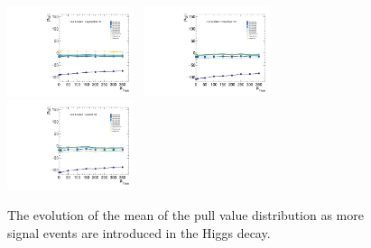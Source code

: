 \begin{figure}[!ht]
  \includegraphics[width=0.33\textwidth]{Fig/BiasStudy/Linearity/HJpsiG/pull_mean_linearity_TrueFunc6}~
  \includegraphics[width=0.33\textwidth]{Fig/BiasStudy/Linearity/HJpsiG/pull_mean_linearity_TrueFunc7}~
  \includegraphics[width=0.33\textwidth]{Fig/BiasStudy/Linearity/HJpsiG/pull_mean_linearity_TrueFunc8}\\
  \caption{The evolution of the mean of the pull value distribution as more signal events are introduced in the Higgs decay.}
  \label{fig:Linearity_mean_HJpsiG}
\end{figure}
\clearpage
